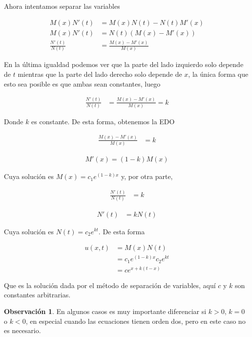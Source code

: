 \documentclass{article}
\theoremstyle{plain}
\theoremstyle{definition}
\newtheorem{rmk}[thm]{Observación}
\begin{document}
Ahora intentamos separar las variables

\begin{align*}
    M(x)N'(t) &=  M(x)N(t)-N(t)M'(x) \\
    M(x)N'(t) &=  N(t)(M(x)-M'(x)) \\
    \frac{N'(t)}{N(t)} &=\frac{M(x)-M'(x)}{M(x)}
\end{align*}

En la última igualdad podemos ver que la parte del lado izquierdo solo depende de $t$ mientras que la parte del lado derecho solo depende de $x$, la única forma que esto sea posible es que ambas sean constantes, luego

\begin{align*}
    \frac{N'(t)}{N(t)} &=\frac{M(x)-M'(x)}{M(x)}= k
\end{align*}

Donde $k$ es constante. De esta forma, obtenemos la EDO


\begin{align*}
    \frac{M(x)-M'(x)}{M(x)} &= k
\end{align*}

\begin{align*}
    M'(x)=(1-k)M(x)
\end{align*}

Cuya solución es $M(x) = c_1e^{(1-k)x}$ y, por otra parte,


\begin{align*}
    \frac{N'(t)}{N(t)} &= k
\end{align*}

\begin{align*}
    N'(t) &= kN(t)
\end{align*}

Cuya solución es $N(t) = c_2 e^{kt}$. De esta forma

\begin{align*}
    u(x,t) &= M(x)N(t) \\
    &= c_1e^{(1-k)x}c_2 e^{kt} \\
    &= ce^{x+k(t-x)}
\end{align*}

Que es la solución dada por el método de separación de variables, aquí $c$ y $k$ son constantes arbitrarias. \\

\begin{rmk}En algunos casos es muy importante diferenciar si $k>0$, $k=0$ o $k< 0$, en especial cuando las ecuaciones tienen orden dos, pero en este caso no es necesario. \\ \\
\end{rmk}
\end{document}
